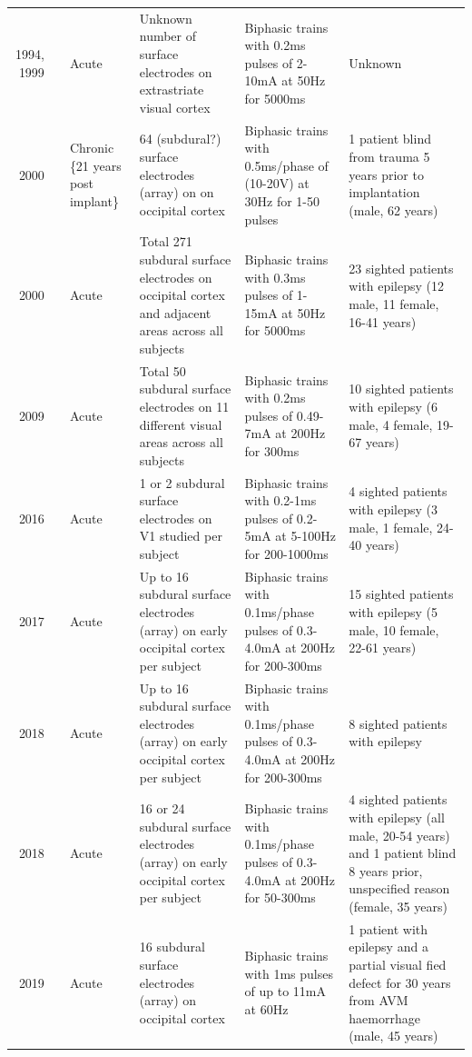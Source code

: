 \documentclass[a4paper,11pt,openany]{book}
\begin{document}
\begin{table}
\begin{tabu}{rlXX[2]X[2]X[2]}
1994, 1999 & \cite{allison_face_1994,puce_electrophysiological_1999} & Acute & Unknown number of surface electrodes on extrastriate visual cortex & Biphasic trains with 0.2ms pulses of 2-10mA at 50Hz for 5000ms & Unknown\\
2000 & \cite{dobelle_artificial_2000} & Chronic \newline \{\tiny 21 years post implant\} & 64 (subdural?) surface electrodes (array) on on occipital cortex & Biphasic trains with 0.5ms/phase of (10-20V) at 30Hz for 1-50 pulses & 1 patient blind from trauma 5 years prior to implantation (male, 62 years)\\
2000 & \cite{lee_mapping_2000} & Acute & Total 271 subdural surface electrodes on occipital cortex and adjacent areas across all subjects & Biphasic trains with 0.3ms pulses of 1-15mA at 50Hz for 5000ms & 23 sighted patients with epilepsy (12 male, 11 female, 16-41 years)\\
2009 & \cite{murphey_perceiving_2009} & Acute & Total 50 subdural surface electrodes on 11 different visual areas across all subjects & Biphasic trains with 0.2ms pulses of 0.49-7mA at 200Hz for 300ms & 10 sighted patients with epilepsy (6 male, 4 female, 19-67 years)\\
2016 & \cite{winawer_linking_2016} & Acute & 1 or 2 subdural surface electrodes on V1 studied per subject & Biphasic trains with 0.2-1ms pulses of 0.2-5mA at 5-100Hz for 200-1000ms & 4 sighted patients with epilepsy (3 male, 1 female, 24-40 years)\\
2017 & \cite{bosking_saturation_2017} & Acute & Up to 16 subdural surface electrodes (array) on early occipital cortex per subject & Biphasic trains with 0.1ms/phase pulses of 0.3-4.0mA at 200Hz for 200-300ms & 15 sighted patients with epilepsy (5 male, 10 female, 22-61 years)\\
2018 & \cite{bosking_rules_2018} & Acute & Up to 16 subdural surface electrodes (array) on early occipital cortex per subject & Biphasic trains with 0.1ms/phase pulses of 0.3-4.0mA at 200Hz for 200-300ms & 8 sighted patients with epilepsy\\
2018 & \cite{beauchamp_dynamic_2018} & Acute & 16 or 24 subdural surface electrodes (array) on early occipital cortex per subject & Biphasic trains with 0.1ms/phase pulses of 0.3-4.0mA at 200Hz for 50-300ms & 4 sighted patients with epilepsy (all male, 20-54 years) and 1 patient blind 8 years prior, unspecified reason (female, 35 years)\\
2019 & \cite{collins_preserved_2019} & Acute & 16 subdural surface electrodes (array) on occipital cortex & Biphasic trains with 1ms pulses of up to 11mA at 60Hz & 1 patient with epilepsy and a partial visual fied defect for 30 years from AVM haemorrhage (male, 45 years)\\
\end{tabu}
\end{table}
\restoregeometry
\linespread{1.5}
\end{document}
